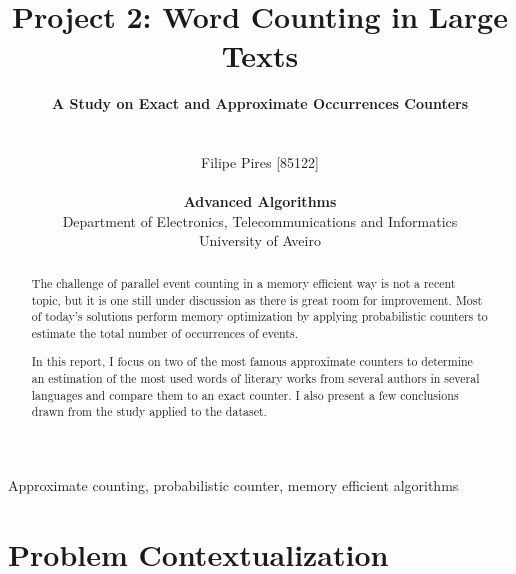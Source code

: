 \documentclass[shortpaper]{revdetua}
\begin{document}
 

\title{
    \LARGE{{\bf Project 2: Word Counting in Large Texts \/}}
    \vspace{-20pt}
}

\author{
    \Large{{\bf A Study on Exact and Approximate Occurrences Counters\/}}\\\\\\
    Filipe Pires [85122]\\
    \\
    {\bf Advanced Algorithms\/}\\
    \normalsize{Department of Electronics, Telecommunications and Informatics}\\
    \normalsize{University of Aveiro}\\
} 

\maketitle


\begin{abstract}
    The challenge of parallel event counting in a memory efficient way is not
    a recent topic, but it is one still under discussion as there is great room
    for improvement.
    Most of today's solutions perform memory optimization by applying probabilistic 
    counters to estimate the total number of occurrences of events.

    In this report, I focus on two of the most famous approximate counters to 
    determine an estimation of the most used words of literary works from several 
    authors in several languages and compare them to an exact counter.
    I also present a few conclusions drawn from the study applied to the dataset.
\end{abstract}

\begin{keywords}
    Approximate counting, probabilistic counter, memory efficient algorithms 
\end{keywords}


\section{Problem Contextualization}
\end{document}
